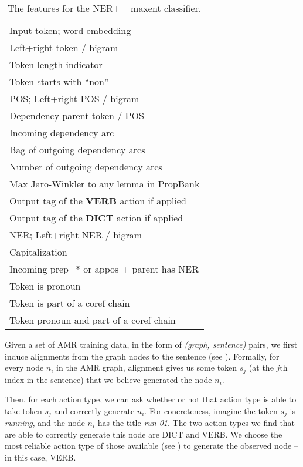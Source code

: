 \documentclass[11pt]{article}
\newcommand\w[1]{\textit{#1}} %
\newcommand\n[1]{\textit{#1}} %
\begin{document}
\begin{table}[t]
\small
\begin{center}
\begin{tabular}{l}
Input token; word embedding                  \\
Left+right token / bigram                    \\
Token length indicator     \\
Token starts with ``non''     \\
POS; Left+right POS / bigram                 \\
Dependency parent token / POS                \\
Incoming dependency arc                      \\
Bag of outgoing dependency arcs              \\
Number of outgoing dependency arcs           \\
Max Jaro-Winkler to any lemma in PropBank      \\
Output tag of the \textbf{VERB} action if applied \\
Output tag of the \textbf{DICT} action if applied \\
NER; Left+right NER / bigram                 \\
Capitalization                               \\
Incoming prep\_* or appos + parent has NER   \\
Token is pronoun                             \\
Token is part of a coref chain               \\
Token pronoun and part of a coref chain     \\
\end{tabular}
\end{center}
\caption{\label{tab:features} The features for the NER++ maxent classifier. }
\end{table}

Given a set of AMR training data, in the form of \w{(graph, sentence)} pairs,
  we first induce alignments from the graph nodes to the sentence 
  (see ).
Formally, for every node $n_i$ in the AMR graph, alignment gives us some token $s_j$ (at the $j$th index in the sentence) that we believe generated the node $n_i$.

Then, for each action type, we can ask whether or not that action type is able to 
  take token $s_j$ and correctly generate $n_i$. 
For concreteness, imagine the token $s_j$ is \w{running}, and the node $n_i$ has 
  the title \n{run-01}.
The two action types we find that are 
  able to correctly generate this node are DICT and VERB. 
We choose the most reliable action type of those available (see )
  to generate the observed node -- in this case, VERB.
\end{document}
